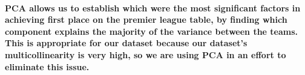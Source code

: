 \paragraph{PCA allows us to establish which were the most significant factors in achieving first place on the premier league table, by finding which component explains the majority of the variance between the teams. This is appropriate for our dataset because our dataset's multicollinearity is very high, so we are using PCA in an effort to eliminate this issue.}
% 
% 